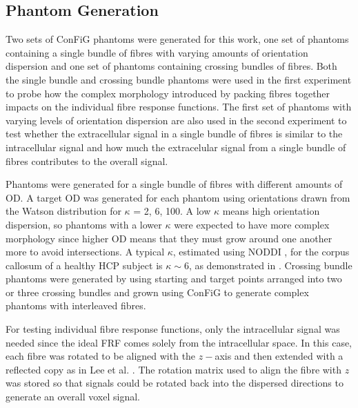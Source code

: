 \subsection{Phantom Generation}
\label{sec:frf_phantom_generation}
Two sets of \ac{ConFiG} phantoms were generated for this work, one set of phantoms containing a single bundle of fibres with varying amounts of orientation dispersion and one set of phantoms containing crossing bundles of fibres. Both the single bundle and crossing bundle phantoms were used in the first experiment to probe how the complex morphology introduced by packing fibres together impacts on the individual fibre response functions.
The first set of phantoms with varying levels of orientation dispersion are also used in the second experiment to test whether the extracellular signal in a single bundle of fibres is similar to the intracellular signal and how much the extracelular signal from a single bundle of fibres contributes to the overall signal.

Phantoms were generated for a single bundle of fibres with different amounts of \ac{OD}. A target \ac{OD} was generated for each phantom using orientations drawn from the Watson distribution \cite{Mardia2008} for $\kappa$ = 2, 6, 100.
A low $\kappa$ means high orientation dispersion, so phantoms with a lower $\kappa$ were expected to have more complex morphology since higher \ac{OD} means that they must grow around one another more to avoid intersections. A typical $\kappa$, estimated using \ac{NODDI} \cite{Zhang2012}, for the corpus callosum of a healthy \ac{HCP} \cite{Sotiropoulos2013a,VanEssen2012} subject is $\kappa \sim 6$, as demonstrated in .
Crossing bundle phantoms were generated by using starting and target points arranged into two or three crossing bundles and grown using \ac{ConFiG} to generate complex phantoms with interleaved fibres.

For testing individual fibre response functions, only the intracellular signal was needed since the ideal \ac{FRF} comes solely from the intracellular space. In this case, each fibre was rotated to be aligned with the $z-$axis and then extended with a reflected copy as in Lee et al. \cite{Lee2019a}. The rotation matrix used to align the fibre with $z$ was stored so that signals could be rotated back into the dispersed directions to generate an overall voxel signal.

